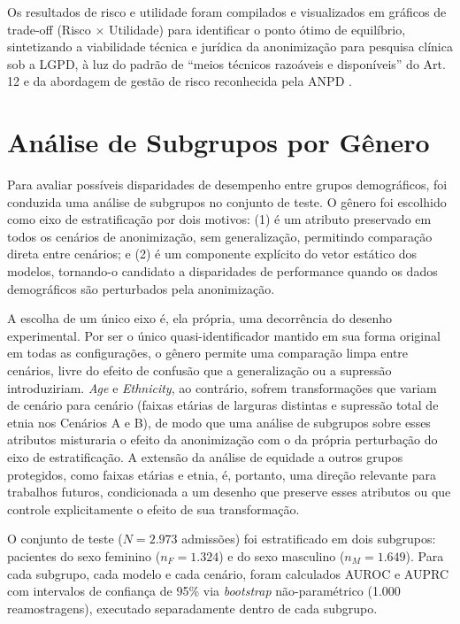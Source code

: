 Os resultados de risco e utilidade foram compilados e visualizados em gráficos de trade-off (Risco $\times$ Utilidade) para identificar o ponto ótimo de equilíbrio, sintetizando a viabilidade técnica e jurídica da anonimização para pesquisa clínica sob a LGPD, à luz do padrão de ``meios técnicos razoáveis e disponíveis'' do Art. 12 \cite{Brasil2018lgpd} e da abordagem de gestão de risco reconhecida pela ANPD \cite{ANPD2023computacional, ANPD2023juridica}.

\section{Análise de Subgrupos por Gênero}
\label{sec:metod-subgrupos}

Para avaliar possíveis disparidades de desempenho entre grupos demográficos, foi conduzida uma análise de subgrupos no conjunto de teste. O gênero foi escolhido como eixo de estratificação por dois motivos: (1) é um atributo preservado em todos os cenários de anonimização, sem generalização, permitindo comparação direta entre cenários; e (2) é um componente explícito do vetor estático dos modelos, tornando-o candidato a disparidades de performance quando os dados demográficos são perturbados pela anonimização.

A escolha de um único eixo é, ela própria, uma decorrência do desenho experimental. Por ser o único quasi-identificador mantido em sua forma original em todas as configurações, o gênero permite uma comparação limpa entre cenários, livre do efeito de confusão que a generalização ou a supressão introduziriam. \textit{Age} e \textit{Ethnicity}, ao contrário, sofrem transformações que variam de cenário para cenário (faixas etárias de larguras distintas e supressão total de etnia nos Cenários A e B), de modo que uma análise de subgrupos sobre esses atributos misturaria o efeito da anonimização com o da própria perturbação do eixo de estratificação. A extensão da análise de equidade a outros grupos protegidos, como faixas etárias e etnia, é, portanto, uma direção relevante para trabalhos futuros, condicionada a um desenho que preserve esses atributos ou que controle explicitamente o efeito de sua transformação.

O conjunto de teste ($N = 2.973$ admissões) foi estratificado em dois subgrupos: pacientes do sexo feminino ($n_F = 1.324$) e do sexo masculino ($n_M = 1.649$). Para cada subgrupo, cada modelo e cada cenário, foram calculados AUROC e AUPRC com intervalos de confiança de 95\% via \textit{bootstrap} não-paramétrico (1.000 reamostragens), executado separadamente dentro de cada subgrupo.

